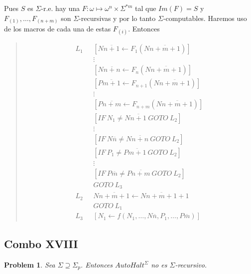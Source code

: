 \documentclass[a4paper, 12pt]{article}
\newtheorem{problem}{Problem}
\newtheorem{problem}{Problem}
\begin{document}
Pues $S$ es $\Sigma$-r.e. hay una $F : \omega \mapsto \omega^{n} \times
\Sigma^{*m} $ tal que $Im(F) = S$ y $F_{(1)}, \ldots, F_{ (n+m) }$ son $\Sigma$-recursivas y por lo
tanto $\Sigma$-computables. Haremos uso de los macros de cada una de estas
$F_{(i)}$. Entonces 


\small
\begin{quote}

\begin{align*}
    L_1 ~ ~ ~ &[N \overline{n+1} \leftarrow F_1(N \overline{n + m + 1})] \\ 
    &\vdots\\
    &[N \overline{n+n} \leftarrow F_n(N \overline{n + m + 1})] \\ 
    &[P \overline{m+1} \leftarrow F_{n+1}(N \overline{n + m + 1})] \\ 
    &\vdots\\
    &[P \overline{n+m} \leftarrow F_{n+m}(N \overline{n + m + 1})] \\ 
    &[IF ~ N_1 \neq N \overline{n+1} ~ GOTO ~ L_2] \\ 
    &\vdots\\
    &[IF ~ N\overline{n} \neq N \overline{n+n} ~ GOTO ~ L_2] \\ 
    &[IF ~ P_1 \neq P \overline{m+1} ~ GOTO ~ L_2] \\ 
    &\vdots\\
    &[IF ~ P\overline{m} \neq P \overline{n+m} ~ GOTO ~ L_2] \\ 
    &GOTO ~ L_3 \\ 
    L_2 ~ ~ ~ & N \overline{n+m+1} \leftarrow N \overline{n+m+1} + 1 \\ 
              &GOTO ~ L_1 \\ 
    L_3 ~ ~ ~ & \left[ N_1 \leftarrow f(N_1, \ldots, N \overline{n}, P_1,
    \ldots, P \overline{m}) \right] 
\end{align*}

\end{quote}
\normalsize


\pagebreak


\subsection{Combo XVIII} 

\begin{problem}
    Sea $\Sigma \supseteq \Sigma_p$. Entonces $AutoHalt^{\Sigma}$ no es
    $\Sigma$-recursivo.
\end{problem}
\end{document}
